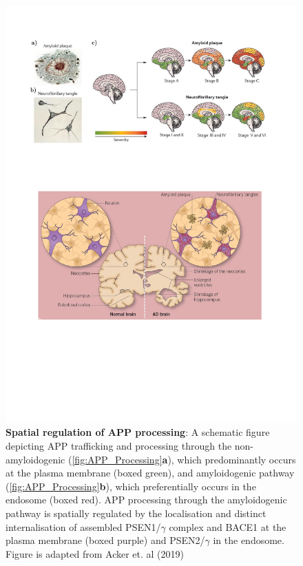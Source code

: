\begin{figure}[!htp]
	\centering
	\includegraphics[page=6,trim={0 8cm 0cm 0cm},clip, scale = 0.7]{Figures/Introduction_Figures.pdf}
	\captionsetup{width=0.95\textwidth,singlelinecheck=off}
	\caption[Spatial regulation of APP trafficking and processing]%
	{\textbf{Spatial regulation of APP processing}: A schematic figure depicting APP trafficking and processing through the non-amyloidogenic (\cref{fig:APP_Processing}\textbf{a}), which predominantly occurs at the plasma membrane (boxed green), and amyloidogenic pathway (\cref{fig:APP_Processing}\textbf{b}), which preferentially occurs in the endosome (boxed red). APP processing through the amyloidogenic pathway is spatially regulated by the localisation and distinct internalisation of assembled PSEN1/$\gamma$ complex and BACE1 at the plasma membrane (boxed purple) and PSEN2/$\gamma$ in the endosome. Figure is adapted from Acker et. al (2019)\cite{Acker2019}  
	}
	\label{fig:APP_Trafficking}
\end{figure}

